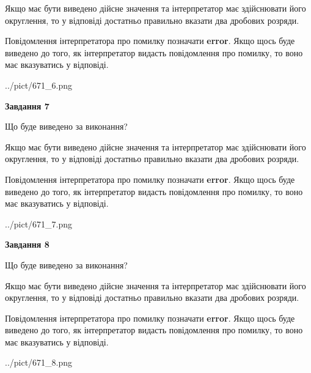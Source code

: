 \documentclass[12pt, ukrainian]{article}
\begin{document}
{\begin {Large}
Якщо має бути виведено дійсне значення та інтерпретатор має здійснювати його округлення, 
то у відповіді достатньо правильно вказати два дробових розряди.

Повідомлення інтерпретатора про помилку позначати \textbf{error}.
Якщо щось буде виведено до того, як інтерпретатор видасть повідомлення про помилку, 
то воно має вказуватись у відповіді. \par

\begin{center}
	{../pict/671_6.png}
\end{center}
\newpage

{\begin {center}\textbf{Завдання 7}\end {center}}\par
Що буде виведено за виконання? \par

Якщо має бути виведено дійсне значення та інтерпретатор має здійснювати його округлення, 
то у відповіді достатньо правильно вказати два дробових розряди.

Повідомлення інтерпретатора про помилку позначати \textbf{error}.
Якщо щось буде виведено до того, як інтерпретатор видасть повідомлення про помилку, 
то воно має вказуватись у відповіді. \par

\begin{center}
	{../pict/671_7.png}
\end{center}
\newpage

{\begin {center}\textbf{Завдання 8}\end {center}}\par
Що буде виведено за виконання? \par

Якщо має бути виведено дійсне значення та інтерпретатор має здійснювати його округлення, 
то у відповіді достатньо правильно вказати два дробових розряди.

Повідомлення інтерпретатора про помилку позначати \textbf{error}.
Якщо щось буде виведено до того, як інтерпретатор видасть повідомлення про помилку, 
то воно має вказуватись у відповіді. \par

\begin{center}
	{../pict/671_8.png}
\end{center}
\newpage


\end{Large}}
\end{document}
